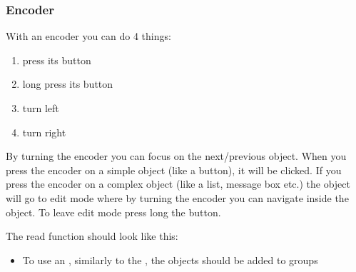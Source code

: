 \documentclass[letterpaper,10pt,english]{sphinxmanual}
\begin{document}
\subsubsection{Encoder}
\label{\detokenize{porting/indev:encoder}}
With an encoder you can do 4 things:
\begin{enumerate}
\item {} 
press its button

\item {} 
long press its button

\item {} 
turn left

\item {} 
turn right

\end{enumerate}

By turning the encoder you can focus on the next/previous object. When you press the encoder on a simple object (like a button), it will be clicked. If you press the encoder on a complex object (like a list, message box etc.) the object will go to edit mode where by turning the encoder you can navigate inside the object. To leave edit mode press long the button.

%
\begin{sphinxVerbatim}[commandchars=\\\{\}]
  
  
\end{sphinxVerbatim}

The read function should look like this:

%
\begin{sphinxVerbatim}[commandchars=\\\{\}]
 
    
      
      

    
\end{sphinxVerbatim}
\begin{itemize}
\item {} 
To use an , similarly to the , the objects should be added to groups

\end{itemize}
\end{document}
